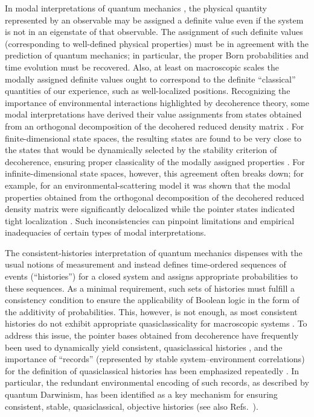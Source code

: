 \documentclass[3p,sort&compress,12pt]{elsarticle}
\begin{document}
In modal interpretations of quantum mechanics \cite{Clifton:1996:op}, the physical quantity represented by an observable may be assigned a definite value even if the system is not in an eigenstate of that observable. The assignment of such definite values (corresponding to well-defined physical properties) must be in agreement with the prediction of quantum mechanics; in particular, the proper Born probabilities and time evolution must be recovered. Also, at least on macroscopic scales the modally assigned definite values ought to correspond to the definite ``classical'' quantities of our experience, such as well-localized positions. Recognizing the importance of environmental interactions  highlighted by decoherence theory, some modal interpretations have derived their value assignments from states obtained from an orthogonal decomposition of the decohered reduced density matrix \cite{Bacciagaluppi:1996:po,Bene:2001:po}. For finite-dimensional state spaces, the resulting states are found to be very close to the states that would be dynamically selected by the stability criterion of decoherence, ensuring proper classicality of the modally assigned properties \cite{Bacciagaluppi:1996:po,Bene:2001:po}. For infinite-dimensional state spaces, however, this agreement often breaks down; for example, for an environmental-scattering model it was shown that the modal properties obtained from the orthogonal decomposition of the decohered reduced density matrix were significantly delocalized while the pointer states indicated tight localization \cite{Bacciagaluppi:2000:yz}. Such inconsistencies can pinpoint limitations and empirical inadequacies of certain types of modal interpretations.

The consistent-histories interpretation of quantum mechanics \cite{Griffiths:1984:tr,Omnes:1994:pz,Griffiths:2002:tr} dispenses with the usual notions of measurement and instead defines time-ordered sequences of events (``histories'') for a closed system and assigns appropriate probabilities to these sequences. As a minimal requirement, such sets of histories must fulfill a consistency condition \cite{Griffiths:1984:tr,Omnes:1994:pz,Griffiths:2002:tr} to ensure the applicability of Boolean logic in the form of the additivity of probabilities. This, however, is not enough, as most consistent histories do not exhibit appropriate quasiclassicality for macroscopic systems \cite{GellMann:1990:uz,GellMann:1991:pp,Zurek:1993:pu,Paz:1993:ww,Albrecht:1993:pq,Dowker:1995:pa,Dowker:1996:ch}. To address this issue, the pointer bases obtained from decoherence have frequently been used to dynamically yield consistent, quasiclassical histories 
\cite{Zurek:1993:pu,Paz:1993:ww,Albrecht:1992:rz,Albrecht:1993:pq,Twamley:1993:bz}, and the importance of ``records'' (represented by stable
system--environment correlations) for the definition of quasiclassical histories  has been emphasized repeatedly \cite{Albrecht:1992:rz,Albrecht:1993:pq,Paz:1993:ww,Zurek:1993:pu,Zurek:2002:ii,GellMann:1998:xy}. In particular, the redundant environmental encoding of such records, as described by quantum Darwinism, has been identified as a key mechanism for ensuring consistent, stable, quasiclassical, objective histories \cite{Riedel:2016:oo} (see also Refs.~\cite{Zurek:1993:pu,Paz:1993:ww,Zurek:2002:ii,Zurek:2003:pl}).
\end{document}
